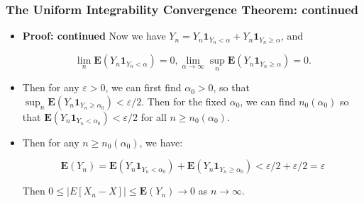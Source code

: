 \documentclass[handout]{beamer}
\newcommand{\BE}{\mathbf{E}}
\newcommand{\BI}{\mathbf{1}}
\begin{document}
\frame
{
  \frametitle{The Uniform Integrability Convergence Theorem: continued} 

\begin{itemize}
   
  
\item<1->\textbf{Proof: continued} Now we have $Y_n=Y_n\BI_{Y_n<\alpha}+Y_n\BI_{Y_n\geq \alpha}$, and 
                
$$\lim_n \BE(Y_n\BI_{Y_n<\alpha})=0, \lim_{\alpha\rightarrow \infty } \sup_n \BE(Y_n\BI_{Y_n\geq \alpha})=0.$$
                   
\item<2->[-] Then for any $\varepsilon>0$, we can first find $\alpha_0>0$, so that $\sup_n \BE(Y_n\BI_{Y_n\geq \alpha_0})<\varepsilon/2$. Then for the fixed $\alpha_0$, we can find $n_0 (\alpha_0)$ so that  $\BE(Y_n\BI_{Y_n<\alpha_0}) <\varepsilon/2$ for all $n\geq n_0 (\alpha_0)$. 
                                       
\item<3->[-] Then for any $n\geq n_0(\alpha_0)$, we have:
                                        
$$\BE(Y_n)=\BE(Y_n\BI_{Y_n<\alpha_0})+\BE(Y_n\BI_{Y_n\geq \alpha_0} )< \varepsilon/2+\varepsilon/2=\varepsilon$$


Then $0 \le \left|E[X_n - X] \right| \le \BE(Y_n) \to 0$ as $n \to \infty$.

\end{itemize}
}
\end{document}
